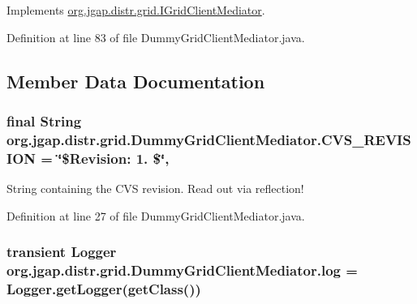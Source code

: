 Implements \hyperlink{interfaceorg_1_1jgap_1_1distr_1_1grid_1_1_i_grid_client_mediator_a1754c025617ae00ef9c8905c5b7aa4ec}{org.\-jgap.\-distr.\-grid.\-I\-Grid\-Client\-Mediator}.



Definition at line 83 of file Dummy\-Grid\-Client\-Mediator.\-java.



\subsection{Member Data Documentation}
\hypertarget{classorg_1_1jgap_1_1distr_1_1grid_1_1_dummy_grid_client_mediator_a894855d63dd785d9b523712f9eee9770}{
\subsubsection[{C\-V\-S\-\_\-\-R\-E\-V\-I\-S\-I\-O\-N}]{\setlength{\rightskip}{0pt plus 5cm}final String org.\-jgap.\-distr.\-grid.\-Dummy\-Grid\-Client\-Mediator.\-C\-V\-S\-\_\-\-R\-E\-V\-I\-S\-I\-O\-N = \char`\"{}\$Revision\-: 1. \$\char`\"{}\hspace{0.3cm}{\ttfamily [static]}, {\ttfamily [private]}}}\label{classorg_1_1jgap_1_1distr_1_1grid_1_1_dummy_grid_client_mediator_a894855d63dd785d9b523712f9eee9770}
String containing the C\-V\-S revision. Read out via reflection! 

Definition at line 27 of file Dummy\-Grid\-Client\-Mediator.\-java.

\hypertarget{classorg_1_1jgap_1_1distr_1_1grid_1_1_dummy_grid_client_mediator_a5b46671cbe448716a12f21528a01cd9e}{
\subsubsection[{log}]{\setlength{\rightskip}{0pt plus 5cm}transient Logger org.\-jgap.\-distr.\-grid.\-Dummy\-Grid\-Client\-Mediator.\-log = Logger.\-get\-Logger(get\-Class())\hspace{0.3cm}{\ttfamily [private]}}}\label{classorg_1_1jgap_1_1distr_1_1grid_1_1_dummy_grid_client_mediator_a5b46671cbe448716a12f21528a01cd9e}


